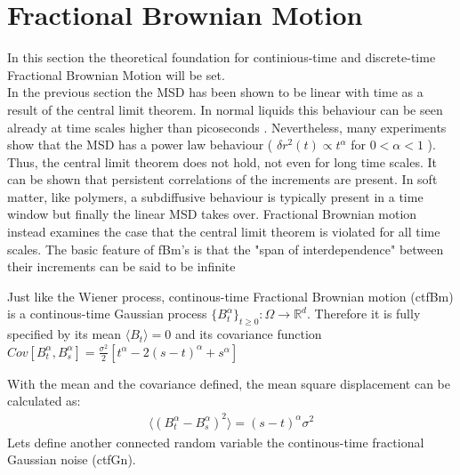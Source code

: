 \documentclass[
  a4paper,BCOR10mm,oneside,
  bibtotoc,idxtotoc,
  headsepline,footsepline,%
  fleqn,openbib
]{scrbook}
\begin{document}


\section{Fractional Brownian Motion}\label{sectionfrac}
In this section the theoretical foundation for continious-time and discrete-time Fractional Brownian Motion will be set. \\
In the previous section the MSD has been shown to be linear with time as a result of the central limit theorem. In normal liquids this behaviour can be seen already at time scales higher than picoseconds \cite{Hofling2013}. Nevertheless, many experiments show that the MSD has a power law behaviour ( $\delta r ^2 (t) \propto t^{\alpha}$ for  $0 < \alpha < 1$ ). Thus, the central limit theorem does not hold, not even for long time scales. It can be shown that persistent correlations of the increments are present. In soft matter, like polymers, a subdiffusive behaviour is typically present in a time window but finally the linear MSD takes over. Fractional Brownian motion instead examines the case that the central limit theorem is violated for all time scales. The basic feature of fBm's is that the "span of interdependence" between their increments can be said to be infinite \cite{Mandelbrot1968}\\
\begin{mydef}
Just like the Wiener process, continous-time Fractional Brownian motion (ctfBm) is a continous-time Gaussian process $\{B^{\alpha}_t\}_{t\geq0}: \Omega \rightarrow \mathbb{R}^d$. Therefore it is fully specified by its mean $\langle B_t \rangle=0$ and its covariance function $Cov[B^{\alpha}_t,B^{\alpha}_s]=\frac{\sigma^2}{2}[t^{\alpha}-2(s-t)^{\alpha}+s^{\alpha}]$
\end{mydef}
With the mean and the covariance defined, the mean square displacement can be calculated as: 
\begin{align}
\label{MSDfbm}
 \langle (B^{\alpha}_{t}-B^{\alpha}_{s})^2 \rangle = (s-t)^\alpha \sigma^2
\end{align}
Lets define another connected random variable the continous-time fractional Gaussian noise (ctfGn).
\end{document}
